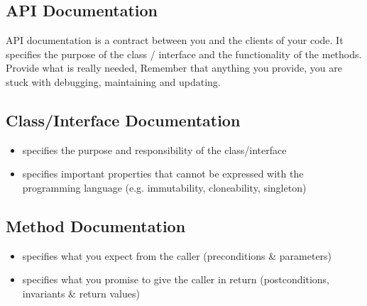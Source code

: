 \documentclass[a4paper,10pt]{article}
\begin{document}
\subsection{API Documentation}
API documentation is a contract between you and the clients of your code. It specifies the purpose of the class / interface and the functionality of the methods. Provide what is really needed, Remember that anything you provide, you are stuck with debugging, maintaining and updating.

\subsection{Class/Interface Documentation}
\begin{itemize}
	\item specifies the purpose and responsibility of the class/interface
	\item specifies important properties that cannot be expressed with the programming language (e.g. immutability, cloneability, singleton)
\end{itemize}

\subsection{Method Documentation}
\begin{itemize}
	\item specifies what you expect from the caller (preconditions \& parameters)
	\item specifies what you promise to give the caller in return (postconditions, invariants \& return values)	
\end{itemize}
\end{document}
